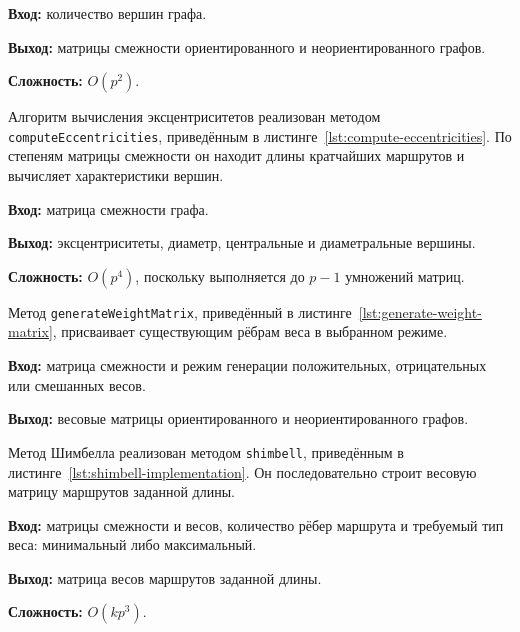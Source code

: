 \textbf{Вход:} количество вершин графа.

\textbf{Выход:} матрицы смежности ориентированного и неориентированного графов.

\textbf{Сложность:} $O(p^2)$.


Алгоритм вычисления эксцентриситетов реализован методом \texttt{computeEccentricities}, приведённым в листинге~\ref{lst:compute-eccentricities}. По степеням матрицы смежности он находит длины кратчайших маршрутов и вычисляет характеристики вершин.

\textbf{Вход:} матрица смежности графа.

\textbf{Выход:} эксцентриситеты, диаметр, центральные и диаметральные вершины.

\textbf{Сложность:} $O(p^4)$, поскольку выполняется до $p-1$ умножений матриц.


Метод \texttt{generateWeight\allowbreak{}Matrix}, приведённый в листинге~\ref{lst:generate-weight-matrix}, присваивает существующим рёбрам веса в выбранном режиме.

\textbf{Вход:} матрица смежности и режим генерации положительных, отрицательных или смешанных весов.

\textbf{Выход:} весовые матрицы ориентированного и неориентированного графов.


Метод Шимбелла реализован методом \texttt{shimbell}, приведённым в листинге~\ref{lst:shimbell-implementation}. Он последовательно строит весовую матрицу маршрутов заданной длины.

\textbf{Вход:} матрицы смежности и весов, количество рёбер маршрута и требуемый тип веса: минимальный либо максимальный.

\textbf{Выход:} матрица весов маршрутов заданной длины.

\textbf{Сложность:} $O(kp^3)$.


